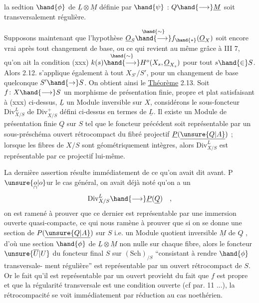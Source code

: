 
la sedtion $\hand{\phi}$ de $\underline{L}\otimes\underline{M}$ définie par $\hand{\psi}$ : $Q\hand{\longrightarrow}\underline{M}$ soit transversalement
régulière.

Supposons maintenant que l'hypothèse $\underline{O}_S\overset{\hand{\sim}}{\hand{\longrightarrow}}f_{\hand{*}}(\underline{O}_X)$ soit encore vrai
après tout changement de base, ou ce qui revient au même grâce à III 7,
qu'on ait la condition
(xxx) \qquad\qquad $k(s)\overset{\hand{\sim}}{\hand{\longrightarrow}}H^o(X_s,\underline{O}_{X_s})$
pour tout $s\hand{\in} S$. Alors 2.12. s'applique également à tout $X_{S'}/S'$, pour un
changement de base quelconque $S'\hand{\rightarrow} S$. On obtient ainsi le
\uline{Théorème} 2.13. Soit $f\colon X\hand{\longrightarrow} S$ un morphisme  de présentation finie,
propre et plat satisfaisant à (xxx) ci-dessus, $\underline{L}$ un Module inversible
sur $X$, considérons le sous-foncteur $\mathrm{Div}^{L}_{X/S}$ de $\mathrm{Div}^{+}_{X/S}$ défini ci-dessus en
termes de $\underline{L}$.  Il existe un Module de présentation finie $\underline{Q}$ sur
$S$ tel que le foncteur précédent soit représentable par un sous-préschéma
ouvert rétrocompact du fibré projectif $\underline{P}(\underline{\unsure{Q|A}})$ ; lorsque les fibres de $X/S$
sont géométriquement intègres, alors $\mathrm{Div}^{L}_{X/S}$ est représentable par ce
  projectif lui-même.

La dernière assertion résulte immédiatement de ce qu'on avait dit
avant. P$\unsure{\underset{\cap}{o}|o}$ur le cas général, on avait déjà noté qu'on a un 
\[
\mathrm{Div}^{L}_{X/S}\hand{\longrightarrow}\underline{P}(\underline{Q}) \quad ,
\]
on est ramené à prouver que ce dernier est représentable par une immersion
ouverte quasi-compacte, ce qui nous ramène à prouver que si on se donne
une section de $P(\underline{\unsure{Q|A}})$ sur $S$ i.e. un Module quotient inversible $\underline{M}$ de $\underline{Q}$ ,
d'où une section $\hand{\phi}$ de $\underline{L}\otimes\underline{M}$ non nulle sur chaque fibre, alors le foncteur
$\unsure{\overline{U}|U}$ du foncteur final $S$ sur $(\mathrm{Sch})_{/S}$ ``consistant à rendre $\hand{\phi}$ transversale-
ment régulière'' est représentable par un ouvert rétrocompact de $S$. Or
le fait qu'il est représentable par un ouvert provieht du fait que $f$ est
propre et que la régularité transversale est une condition ouverte (cf par.
11 ...), la rétrocompacité se voit immédiatement par réduction au cas
noethérien.

